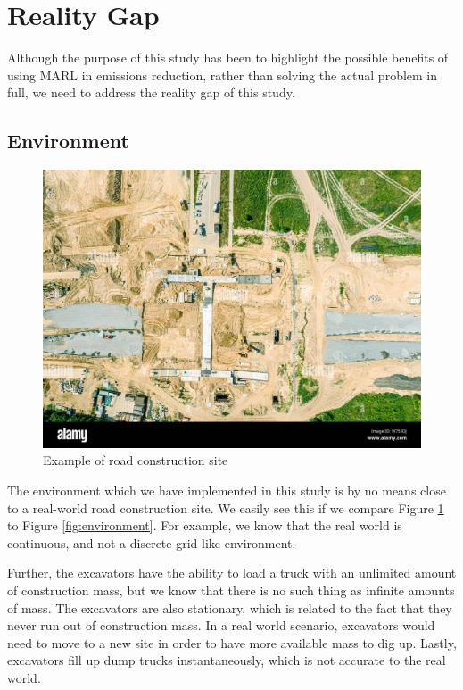 \documentclass[conference]{IEEEtran}
\begin{document}
	\section{Reality Gap}
	Although the purpose of this study has been to highlight the possible benefits of using MARL in
	emissions reduction, rather than solving the actual problem in full, we need to address the reality
	gap of this study.



	\subsection{Environment}
	\begin{figure}[!ht]
		\includegraphics[width=\columnwidth]{graphs/road-construction-site-example.jpeg}
		\caption{Example of road construction site}
		\label{fig:construction-site}
	\end{figure}

	The environment which we have implemented in this study is by no means close to a
	real-world road construction site. We easily see this if we compare Figure \ref{fig:construction-site}
	to Figure \ref{fig:environment}. For example, we know that the real world is continuous, and not a discrete
	grid-like environment.

	Further, the excavators have the ability to load a truck with an unlimited amount of construction mass,
	but we know that there is no such thing as infinite amounts of mass. The excavators are also stationary,
	which is related to the fact that they never run out of construction mass. In a real world scenario,
	excavators would need to move to a new site in order to have more available mass to dig up. Lastly,
	excavators fill up dump trucks instantaneously, which is not accurate to the real world.
\end{document}
